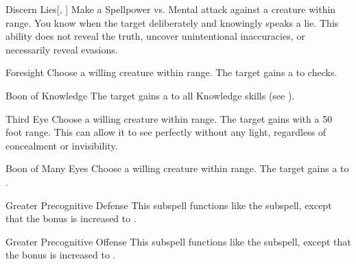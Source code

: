 \begin{ability}[\nth{2}]{Discern Lies}[, ]
Make a Spellpower vs. Mental attack against a creature within \rngmed range.
\hit You know when the target deliberately and knowingly speaks a lie.
This ability does not reveal the truth, uncover unintentional inaccuracies, or necessarily reveal evasions.
\end{ability}
\vspace{0.25em}


\begin{ability}[\nth{2}]{Foresight}
Choose a willing creature within \rngclose range.
The target gains a   to  checks.
\end{ability}
\vspace{0.25em}


\begin{ability}[\nth{3}]{Boon of Knowledge}
The target gains a   to all Knowledge skills (see ).
\end{ability}
\vspace{0.25em}


\begin{ability}[\nth{3}]{Third Eye}
Choose a willing creature within \rngclose range.
The target gains  with a 50 foot range.
This can allow it to see perfectly without any light, regardless of concealment or invisibility.
\end{ability}
\vspace{0.25em}


\begin{ability}[\nth{4}]{Boon of Many Eyes}
Choose a willing creature within \rngclose range.
The target gains a   to .
\end{ability}
\vspace{0.25em}


\begin{ability}[\nth{5}]{Greater Precognitive Defense}
This subspell functions like the  subspell, except that the bonus is increased to .
\end{ability}
\vspace{0.25em}


\begin{ability}[\nth{5}]{Greater Precognitive Offense}
This subspell functions like the  subspell, except that the bonus is increased to .
\end{ability}
\vspace{0.25em}


